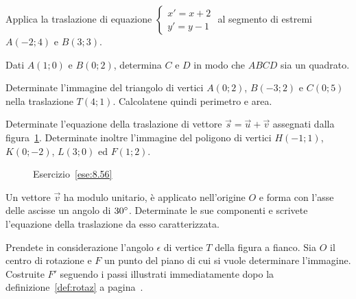 \begin{esercizio}
\label{ese:8.53} %
Applica la traslazione di equazione $\begin{cases}x'=x+2\\y'=y-1\end{cases}$ al segmento di estremi $A(-2;4)$ e $B(3;3)$. 
\end{esercizio}

\begin{esercizio}
\label{ese:8.54} %
Dati $A(1;0)$ e $B(0;2)$, determina $C$ e $D$ in modo che $ABCD$ sia un quadrato.
\end{esercizio}

\begin{esercizio}
\label{ese:8.55} %
Determinate l'immagine del triangolo di vertici $A(0;2)$, $B(-3;2)$ e $C(0;5)$ nella traslazione $T(4;1)$. Calcolatene quindi perimetro e area.
\end{esercizio}

\begin{esercizio}
\label{ese:8.56} %
Determinate l'equazione della traslazione di vettore $\vec{s}=\vec{u}+\vec{v}$ assegnati dalla figura~\ref{fig:ese8.56}. Determinate inoltre l'immagine del poligono di vertici $H(-1;1)$, $K(0;-2)$, $L(3;0)$ ed $F(1;2)$.
\end{esercizio}

\begin{figure}[!htb]
	\centering
	\caption{Esercizio~\ref{ese:8.56}}\label{fig:ese8.56}
\end{figure}\vspace{8pt}

\begin{esercizio}
\label{ese:8.57} %
Un vettore $\vec{v}$ ha modulo unitario, è applicato nell'origine $O$ e forma con l'asse delle ascisse un angolo di $30{}^{\circ}$. Determinate le sue componenti e scrivete l'equazione della traslazione da esso caratterizzata.
\end{esercizio}

\noindent\begin{minipage}{0.7\textwidth}\parindent15pt
\begin{esercizio}
\label{ese:8.58} %
Prendete in considerazione l'angolo $\epsilon$ di vertice $T$ della figura a fianco. Sia $O$ il centro di rotazione e $F$ un punto del piano di cui si vuole determinare l'immagine. Costruite $F'$ seguendo i passi illustrati immediatamente dopo la definizione~\ref{def:rotaz} a pagina~\pageref{def:rotaz}.
\end{esercizio}
\end{minipage}\hfil
\begin{minipage}{0.3\textwidth}
	\centering~~
\end{minipage}\vspace{8pt}


